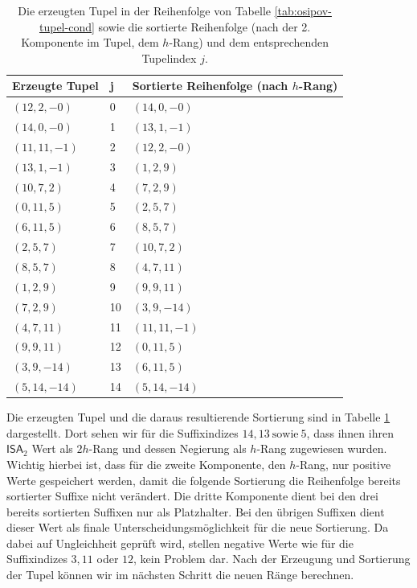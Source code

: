 \begin{table}[]
\small
\begin{tabular}{|l|l|l|}
\hline
Erzeugte Tupel & j  & Sortierte Reihenfolge (nach $h$-Rang) \\ \hline
$(12, 2, -0)$  & 0  & $(14,0,-0)$                           \\ \hline
$(14, 0, -0)$  & 1  & $(13,1,-1)$                           \\ \hline
$(11,11,-1)$   & 2  & $(12,2,-0)$                           \\ \hline
$(13,1,-1)$    & 3  & $(1,2,9)$                             \\ \hline
$(10,7,2)$     & 4  & $(7,2,9)$                             \\ \hline
$(0,11,5)$     & 5  & $(2,5,7)$                             \\ \hline
$(6,11,5)$     & 6  & $(8,5,7)$                             \\ \hline
$(2,5,7)$      & 7  & $(10,7,2)$                            \\ \hline
$(8,5,7)$      & 8  & $(4,7,11)$                            \\ \hline
$(1,2,9)$      & 9  & $(9,9,11)$                            \\ \hline
$(7,2,9)$      & 10 & $(3,9,-14)$                           \\ \hline
$(4,7,11)$     & 11 & $(11,11,-1)$                          \\ \hline
$(9,9,11)$     & 12 & $(0,11,5)$                            \\ \hline
$(3,9,-14)$    & 13 & $(6,11,5)$                            \\ \hline
$(5,14,-14)$   & 14 & $(5,14,-14)$                          \\ \hline
\end{tabular}
\caption{Die erzeugten Tupel in der Reihenfolge von Tabelle \ref{tab:osipov-tupel-cond} sowie die sortierte Reihenfolge (nach der 2. Komponente im Tupel, dem $h$-Rang) und dem entsprechenden Tupelindex $j$.}
\label{tab:osipov-tupel-sort}
\end{table}

Die erzeugten Tupel und die daraus resultierende Sortierung sind in Tabelle \ref{tab:osipov-tupel-sort} dargestellt. Dort sehen wir für die Suffixindizes $14, 13 ~\text{sowie}~ 5$, dass ihnen ihren $\mathsf{ISA}_2$ Wert als $2h$-Rang und dessen Negierung als $h$-Rang zugewiesen wurden. Wichtig hierbei ist, dass für die zweite Komponente, den $h$-Rang, nur positive Werte gespeichert werden, damit die folgende Sortierung die Reihenfolge bereits sortierter Suffixe nicht verändert. Die dritte Komponente dient bei den drei bereits sortierten Suffixen nur als Platzhalter. Bei den übrigen Suffixen dient dieser Wert als finale Unterscheidungsmöglichkeit für die neue Sortierung. Da dabei auf Ungleichheit geprüft wird, stellen negative Werte wie für die Suffixindizes $3, 11$ oder $12$, kein Problem dar. Nach der Erzeugung und Sortierung der Tupel können wir im nächsten Schritt die neuen Ränge berechnen.


